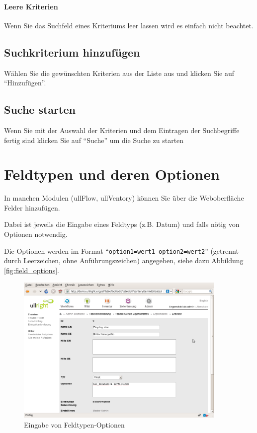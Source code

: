 \documentclass[article, a4paper, oneside, 11pt]{memoir}
\begin{document}
\paragraph{Leere Kriterien}
Wenn Sie das Suchfeld eines Kriteriums leer lassen wird es einfach nicht beachtet.

\subsection{Suchkriterium hinzufügen}
Wählen Sie die gewünschten Kriterien aus der Liste aus und klicken Sie auf "`Hinzufügen"'.

\subsection{Suche starten}
Wenn Sie mit der Auswahl der Kriterien und dem Eintragen der Suchbegriffe fertig sind klicken Sie auf "`Suche"' um die Suche zu starten

\section{Feldtypen und deren Optionen}
In manchen Modulen (ullFlow, ullVentory) können Sie über die Weboberfläche Felder hinzufügen.

Dabei ist jeweils die Eingabe eines Feldtyps (z.B. Datum) und falls nötig von Optionen notwendig.

Die Optionen werden im Format "`\texttt{option1=wert1 option2=wert2}"' (getrennt durch Leerzeichen, ohne Anführungszeichen) angegeben, siehe dazu Abbildung \vref{fig:field_options}.

\begin{figure}[htp]
\centering
\includegraphics[width=0.9\textwidth]{figures/ullrightgermanexport-img6.png}
\caption{Eingabe von Feldtypen-Optionen}
\label{fig:field_options}
\end{figure}
\end{document}
